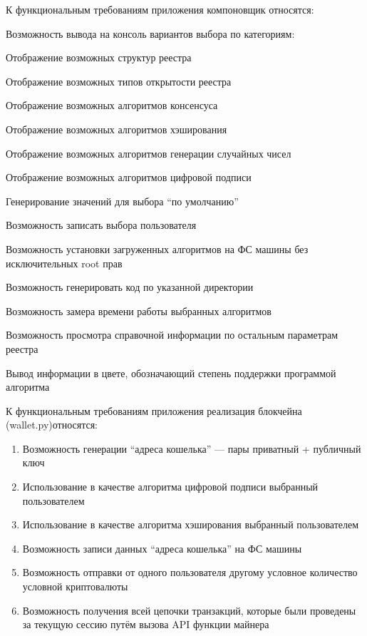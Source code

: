К функциональным требованиям приложения компоновщик относятся:

\begin{my_enumerate}
    \item Возможность вывода на консоль вариантов выбора по категориям:
        \begin{my_enumerate}
                \item Отображение возможных структур реестра
                \item Отображение возможных типов открытости реестра
                \item Отображение возможных алгоритмов консенсуса
                \item Отображение возможных алгоритмов хэширования
                \item Отображение возможных алгоритмов генерации случайных чисел
                \item Отображение возможных алгоритмов цифровой подписи
        \end{my_enumerate}
    \item Генерирование значений для выбора ``по умолчанию''
    \item Возможность записать выбора пользователя
    \item Возможность установки загруженных алгоритмов на ФС машины без исключительных root прав
    \item Возможность генерировать код по указанной директории
    \item Возможность замера времени работы выбранных алгоритмов
    \item Возможность просмотра справочной информации по остальным параметрам реестра
    \item Вывод информации в цвете, обозначающий степень поддержки программой алгоритма
\end{my_enumerate}


К функциональным требованиям приложения реализация блокчейна ({\small wallet.py})относятся:
\begin{enumerate}
    \item Возможность генерации ``адреса кошелька'' --- пары приватный + публичный ключ
    \item Использование в качестве алгоритма цифровой подписи выбранный пользователем
    \item Использование в качестве алгоритма хэширования выбранный пользователем
    \item Возможность записи данных ``адреса кошелька'' на ФС машины
    \item Возможность отправки от одного пользователя другому условное
          количество условной криптовалюты
    \item Возможность получения всей цепочки транзакций, которые были проведены
          за текущую сессию путём вызова API функции майнера
\end{enumerate}

